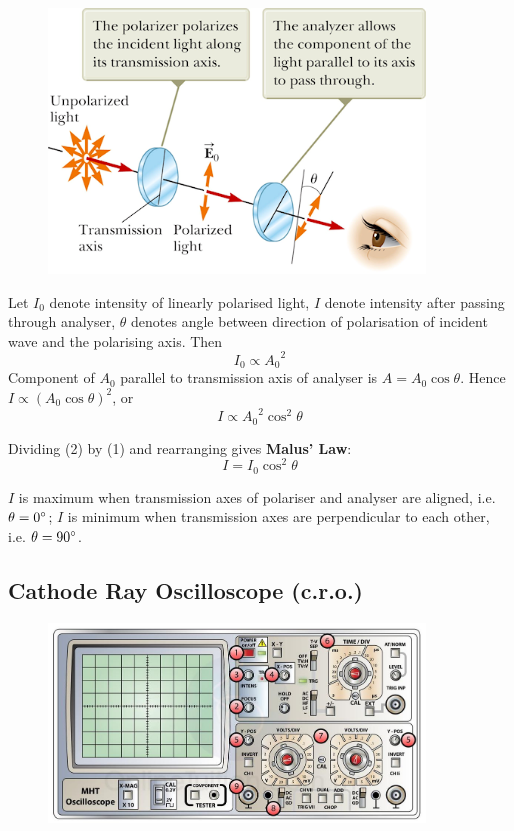 \begin{figure}[H]
    \centering
    \includegraphics[width=10cm]{images/polariser_two.png}
\end{figure}

Let $I_0$ denote intensity of linearly polarised light, $I$ denote intensity after passing through analyser, $\theta$ denotes angle between direction of polarisation of incident wave and the polarising axis. Then
\begin{equation*}\tag{1}
I_0 \propto {A_0}^2
\end{equation*}
Component of $A_0$ parallel to transmission axis of analyser is $A=A_0\cos\theta$. Hence $I \propto (A_0\cos\theta)^2$, or
\begin{equation*}\tag{2}
I \propto {A_0}^2\cos^2\theta
\end{equation*}

Dividing (2) by (1) and rearranging gives \textbf{Malus' Law}:
\begin{equation}
I = I_0\cos^2\theta
\end{equation}

\begin{remark}
$I$ is maximum when transmission axes of polariser and analyser are aligned, i.e. $\theta=0\degree$; $I$ is minimum when transmission axes are perpendicular to each other, i.e. $\theta=90\degree$.
\end{remark}
\pagebreak

\subsection{Cathode Ray Oscilloscope (c.r.o.)}

\begin{figure}[H]
    \centering
    \includegraphics[width=10cm]{images/cro.jpg}
\end{figure}

